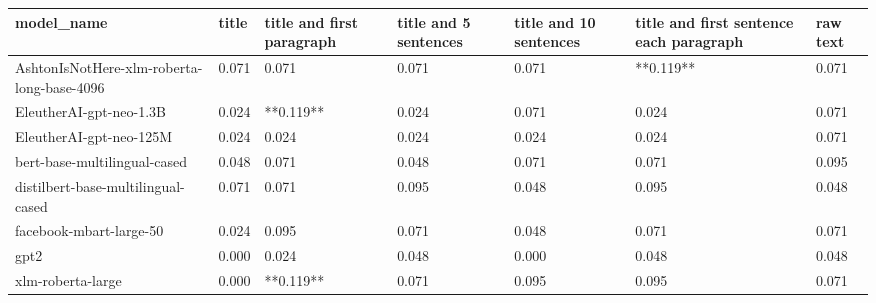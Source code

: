 \begin{tabular}{lllllll}
\toprule
                                model\_name & title & title and first paragraph & title and 5 sentences & title and 10 sentences & title and first sentence each paragraph & raw text \\
\midrule
AshtonIsNotHere-xlm-roberta-long-base-4096 & 0.071 &                     0.071 &                 0.071 &                  0.071 &                               **0.119** &    0.071 \\
                   EleutherAI-gpt-neo-1.3B & 0.024 &                 **0.119** &                 0.024 &                  0.071 &                                   0.024 &    0.071 \\
                   EleutherAI-gpt-neo-125M & 0.024 &                     0.024 &                 0.024 &                  0.024 &                                   0.024 &    0.071 \\
              bert-base-multilingual-cased & 0.048 &                     0.071 &                 0.048 &                  0.071 &                                   0.071 &    0.095 \\
        distilbert-base-multilingual-cased & 0.071 &                     0.071 &                 0.095 &                  0.048 &                                   0.095 &    0.048 \\
                   facebook-mbart-large-50 & 0.024 &                     0.095 &                 0.071 &                  0.048 &                                   0.071 &    0.071 \\
                                      gpt2 & 0.000 &                     0.024 &                 0.048 &                  0.000 &                                   0.048 &    0.048 \\
                         xlm-roberta-large & 0.000 &                 **0.119** &                 0.071 &                  0.095 &                                   0.095 &    0.071 \\
\bottomrule
\end{tabular}
